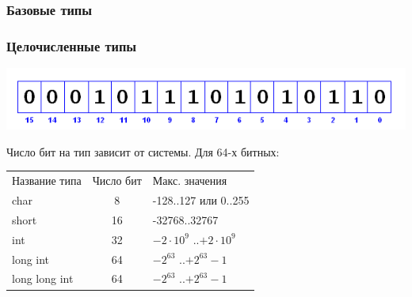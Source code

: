 \documentclass[12pt,pdf,hyperref={unicode}]{beamer}
\begin{document}

\begin{frame}
\frametitle{Базовые типы}
\frametitle{Целочисленные типы} 
\begin{center}
\includegraphics[scale=0.5]{images/bit_positions.png}
\end{center}
Число бит на тип зависит от системы. Для 64-х битных:
\begin{center}
\begin{tabular}{ l c l }
  Название типа & Число бит & Макс. значения \\
  char & 8 & -128..127 или 0..255 \\
  short & 16 & -32768..32767 \\
  int & 32 & $-2 \cdot 10^9$ ..$+2 \cdot 10^9$ \\
  long int & 64& $-2^{63}$ ..$+2^{63}-1$ \\
  long long int & 64 & $-2^{63}$ ..$+2^{63}-1$ \\
\end{tabular}
\end{center}
\end{frame}
\end{document}
